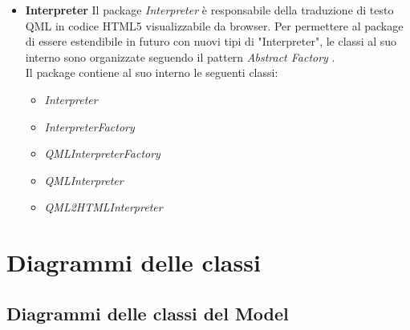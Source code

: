 \documentclass[a4paper,11pt]{article}
\begin{document}
\begin{itemize}
	\item \textbf{Interpreter}
	Il package \emph{Interpreter} è responsabile della traduzione di testo QML in codice HTML5 visualizzabile da browser. Per permettere al package di essere estendibile in futuro con nuovi tipi di "Interpreter", le classi al suo interno sono organizzate seguendo il pattern \emph{Abstract Factory} . \\
	Il package contiene al suo interno le seguenti classi:
	\begin{itemize}
	\item \textit{Interpreter}
	\item \textit{InterpreterFactory}
	\item \textit{QMLInterpreterFactory}
	\item \textit{QMLInterpreter}
	\item \textit{QML2HTMLInterpreter}
	\end{itemize}
	
	\end{itemize}
	\section{Diagrammi delle classi}
		\subsection{Diagrammi delle classi del Model}
\end{document}
